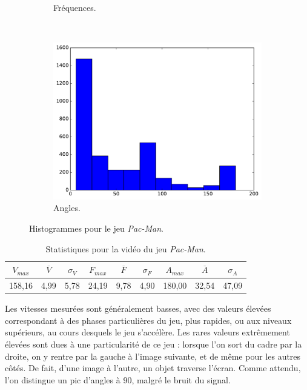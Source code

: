 \begin{figure}[!htbp]
\begin{subfigure}[t]{\subImgWclicks}
			\caption{Fréquences.}
			\label{fig:pacmannA_frequency}
		\end{subfigure}
		~
		\begin{subfigure}[t]{\subImgWclicks}
			\centering
			\includegraphics[width=\textwidth]{figures/ch3/pacmannA_angle}
			\caption{Angles.}
			\label{fig:pacmannA_angle}
		\end{subfigure}
		\caption[Histogrammes pour le jeu \emph{Pac-Man}]{Histogrammes pour le jeu \emph{Pac-Man}.}
		\label{fig:histPacmann}
	\end{figure}
	
\begin{table}
	\centering
	\begin{tabular}{c c c c c c c c c}
		$V_{max}$	& $\overline{V}$	& $\sigma_{V}$	& $F_{max}$	& $\overline{F}$	& $\sigma_{F}$	& $A_{max}$	& $\overline{A}$	& $\sigma_{A}$	\bigstrut[b] \\ \hline

		158,16		& 4,99				& 5,78			& 24,19		& 9,78				& 4,90			& 180,00	& 32,54				& 47,09			\bigstrut[t] \\
	\end{tabular}
	\caption[Statistiques pour la vidéo du jeu \emph{Pac-Man}]{Statistiques pour la vidéo du jeu \emph{Pac-Man}.}
	\label{tab:pacmannA_stats}
\end{table}

	Les vitesses mesurées sont généralement basses, avec des valeurs élevées correspondant à des phases particulières du jeu, plus rapides, ou aux niveaux supérieurs, au cours desquels le jeu s'accélère. Les rares valeurs extrêmement élevées sont dues à une particularité de ce jeu : lorsque l'on sort du cadre par la droite, on y rentre par la gauche à l'image suivante, et de même pour les autres côtés. De fait, d'une image à l'autre, un objet traverse l'écran. Comme attendu, l'on distingue un pic d'angles à 90\textdegree{}, malgré le bruit du signal.

